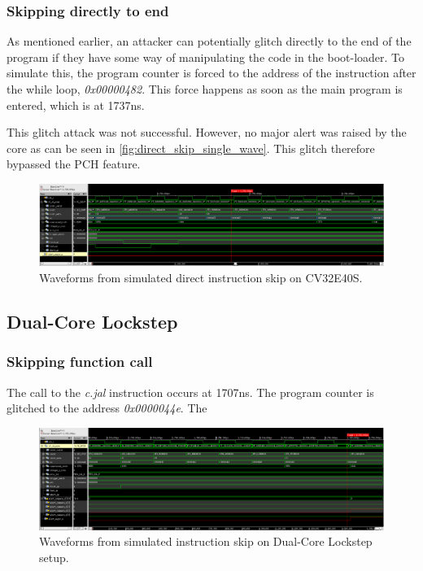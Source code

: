 \subsubsection{Skipping directly to end}

As mentioned earlier, an attacker can potentially glitch directly to the end of the program if they have some way of manipulating the code in the boot-loader. To simulate this, the program counter is forced to the address of the instruction after the while loop, \textit{0x00000482}. This force happens as soon as the main program is entered, which is at 1737ns.

This glitch attack was not successful. However, no major alert was raised by the core as can be seen in \autoref{fig:direct_skip_single_wave}. This glitch therefore bypassed the PCH feature. 

\begin{figure}[h!]
    \centering
    \includegraphics[width=\textwidth]{docs/images/direct_skip_single_core.png}
    \caption{Waveforms from simulated direct instruction skip on CV32E40S.}
    \label{fig:direct_skip_single_wave}
\end{figure}

\subsection{Dual-Core Lockstep}
\label{subsec:dual_instr_skip}

\subsubsection{Skipping function call}

The call to the \textit{c.jal} instruction occurs at 1707ns. The program counter is glitched to the address \textit{0x0000044e}. The 

\begin{figure}[h!]
    \centering
    \includegraphics[width=\textwidth]{docs/images/instr_skip_dual_core.png}
    \caption{Waveforms from simulated instruction skip on Dual-Core Lockstep setup.}
    \label{fig:direct_skip_single_wave}
\end{figure}


